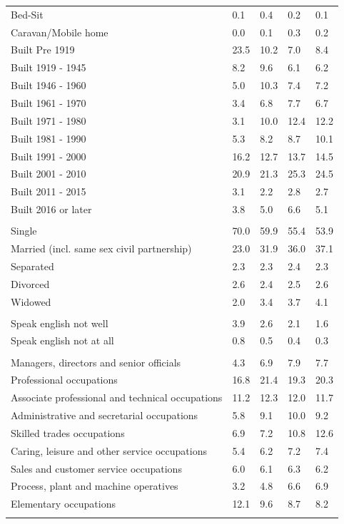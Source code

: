 \documentclass{article}
\begin{document}
\begin{table}[h]
\begin{tabular}{KTTTT}
Bed-Sit & 0.1& 0.4& 0.2& 0.1\\
Caravan/Mobile home & 0.0& 0.1& 0.3& 0.2\\
    \hline
Built Pre 1919 & 23.5& 10.2&  7.0&  8.4\\
Built 1919 - 1945 & 8.2& 9.6& 6.1& 6.2\\
Built  1946 - 1960 &  5.0& 10.3&  7.4&  7.2\\
Built  1961 - 1970 & 3.4& 6.8& 7.7& 6.7\\
Built  1971 - 1980 &  3.1& 10.0& 12.4& 12.2\\
Built  1981 - 1990 &  5.3&  8.2&  8.7& 10.1\\
Built  1991 - 2000 & 16.2& 12.7& 13.7& 14.5\\
Built  2001 - 2010 & 20.9& 21.3& 25.3& 24.5\\
Built  2011 - 2015 & 3.1& 2.2& 2.8& 2.7\\
Built  2016 or later & 3.8& 5.0& 6.6& 5.1\\
\hline
    \\
    \hline
Single & 70.0& 59.9& 55.4& 53.9\\
Married (incl. same sex civil partnership) & 23.0& 31.9& 36.0& 37.1\\
Separated  & 2.3& 2.3& 2.4& 2.3\\
Divorced  & 2.6& 2.4& 2.5& 2.6\\
Widowed & 2.0& 3.4& 3.7& 4.1\\
\hline
    \\ 
    \hline
Speak english not well & 3.9& 2.6& 2.1& 1.6\\
Speak english not at all & 0.8& 0.5& 0.4& 0.3\\
\hline
    \\
    \hline
Managers, directors and senior officials & 4.3& 6.9& 7.9& 7.7\\
Professional occupations & 16.8& 21.4& 19.3& 20.3\\
Associate professional and technical occupations & 11.2& 12.3& 12.0& 11.7\\
Administrative and secretarial occupations &  5.8&  9.1& 10.0&  9.2\\
Skilled trades occupations &  6.9&  7.2& 10.8& 12.6\\
Caring, leisure and other service occupations & 5.4& 6.2& 7.2& 7.4\\
Sales and customer service occupations & 6.0& 6.1& 6.3& 6.2\\
Process, plant and machine operatives & 3.2& 4.8& 6.6& 6.9\\
Elementary occupations & 12.1&  9.6&  8.7&  8.2\\
\hline
\end{tabular}
\end{table}
\end{document}

